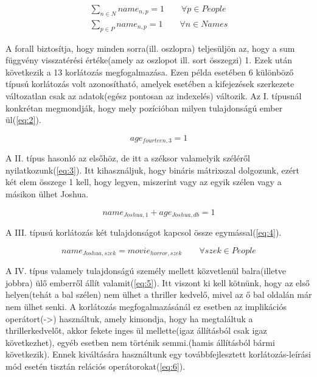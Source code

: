 \documentclass[12pt,a4paper,twoside, openright]{report}
\begin{document}
    \begin{equation} \label{eq:1}
    \begin{aligned}
    \sum_{n\in N} name_{n,p} =1 \qquad \forall p \in People \\
    \sum_{p\in P} name_{n,p} =1 \qquad \forall n \in Names
    \end{aligned}
    \end{equation}

    A forall biztosítja, hogy minden sorra(ill. oszlopra) teljesüljön az, hogy a sum függvény visszatérési értéke(amely az oszlopot ill. sort összegzi) 1.
    Ezek után következik a 13 korlátozás megfogalmazása.
    Ezen példa esetében 6 különböző típusú korlátozás volt azonosítható, amelyek esetében a kifejezések szerkezete változatlan csak az adatok(egész pontosan az indexelés) változik.
    Az I. típusnál konkrétan megmondják, hogy mely pozícióban milyen tulajdonságú ember ül(\ref{eq:2}).

    \begin{equation} \label{eq:2}
     age_ {fourteen,3}=1 
     \end{equation}

    A II. típus hasonló az elsőhöz, de itt a széksor valamelyik széléről nyilatkozunk(\ref{eq:3}).
    Itt kihasználjuk, hogy bináris mátrixszal dolgozunk, ezért két elem összege 1 kell, hogy legyen, miszerint vagy az egyik szélen vagy a másikon ülhet Joshua.

    \begin{equation}  \label{eq:3}
    name_{Joshua,1} + age_{Joshua,db} =1
    \end{equation}

    A III. típusú korlátozás két tulajdonságot kapcsol össze egymással(\ref{eq:4}).

    \begin{equation} \label{eq:4}
    name_{Joshua,szek} = movie_{horror,szek} \qquad \forall szek \in People
    \end{equation}

    A IV. típus valamely tulajdonságú személy mellett közvetlenül balra(illetve jobbra) ülő emberről állít valamit(\ref{eq:5}).
    Itt viszont ki kell kötnünk, hogy az első helyen(tehát a bal szélen) nem ülhet a thriller kedvelő, mivel az ő bal oldalán már nem ülhet senki.
    A korlátozás megfogalmazásánál ez esetben az implikációs operátort(->) használtuk, amely kimondja, hogy ha megtaláltuk a thrillerkedvelőt, akkor fekete inges ül mellette(igaz állításból csak igaz következhet), egyéb esetben nem történik semmi.(hamis állításból bármi következik).
    Ennek kiváltására használtunk egy továbbfejlesztett korlátozás-leírási mód esetén tisztán relációs operátorokat(\ref{eq:6}).
\end{document}
